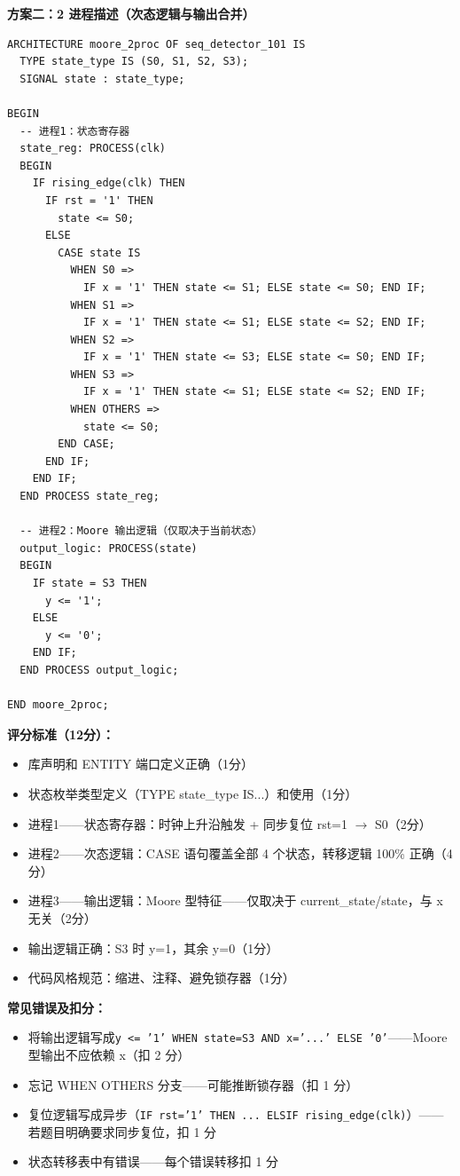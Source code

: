 \textbf{方案二：2 进程描述（次态逻辑与输出合并）}

\begin{lstlisting}[style=Vivado]
ARCHITECTURE moore_2proc OF seq_detector_101 IS
  TYPE state_type IS (S0, S1, S2, S3);
  SIGNAL state : state_type;

BEGIN
  -- 进程1：状态寄存器
  state_reg: PROCESS(clk)
  BEGIN
    IF rising_edge(clk) THEN
      IF rst = '1' THEN
        state <= S0;
      ELSE
        CASE state IS
          WHEN S0 =>
            IF x = '1' THEN state <= S1; ELSE state <= S0; END IF;
          WHEN S1 =>
            IF x = '1' THEN state <= S1; ELSE state <= S2; END IF;
          WHEN S2 =>
            IF x = '1' THEN state <= S3; ELSE state <= S0; END IF;
          WHEN S3 =>
            IF x = '1' THEN state <= S1; ELSE state <= S2; END IF;
          WHEN OTHERS =>
            state <= S0;
        END CASE;
      END IF;
    END IF;
  END PROCESS state_reg;

  -- 进程2：Moore 输出逻辑（仅取决于当前状态）
  output_logic: PROCESS(state)
  BEGIN
    IF state = S3 THEN
      y <= '1';
    ELSE
      y <= '0';
    END IF;
  END PROCESS output_logic;

END moore_2proc;
\end{lstlisting}

\textbf{评分标准（12分）：}
\begin{itemize}
    \item 库声明和 ENTITY 端口定义正确（1分）
    \item 状态枚举类型定义（TYPE state\_type IS...）和使用（1分）
    \item 进程1——状态寄存器：时钟上升沿触发 + 同步复位 rst=1 $\rightarrow$ S0（2分）
    \item 进程2——次态逻辑：CASE 语句覆盖全部 4 个状态，转移逻辑 100\% 正确（4分）
    \item 进程3——输出逻辑：Moore 型特征——仅取决于 current\_state/state，与 x 无关（2分）
    \item 输出逻辑正确：S3 时 y=1，其余 y=0（1分）
    \item 代码风格规范：缩进、注释、避免锁存器（1分）
\end{itemize}

\textbf{常见错误及扣分：}
\begin{itemize}
    \item 将输出逻辑写成\texttt{y <= '1' WHEN state=S3 AND x='...' ELSE '0'}——Moore 型输出不应依赖 x（扣 2 分）
    \item 忘记 WHEN OTHERS 分支——可能推断锁存器（扣 1 分）
    \item 复位逻辑写成异步（\texttt{IF rst='1' THEN ... ELSIF rising\_edge(clk)}）——若题目明确要求同步复位，扣 1 分
    \item 状态转移表中有错误——每个错误转移扣 1 分
\end{itemize}


